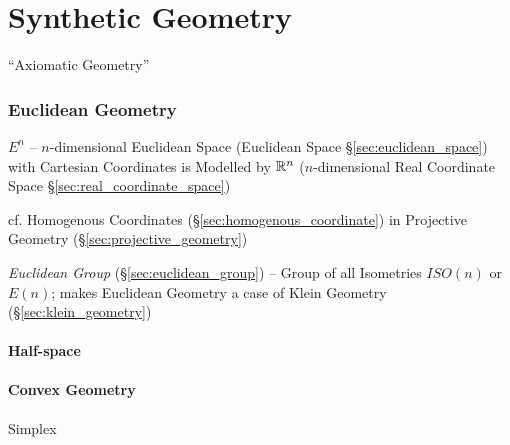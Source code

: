 \part{Synthetic Geometry}\label{part:synthetic_geometry}

``Axiomatic Geometry''



\section{Euclidean Geometry}\label{sec:euclidean_geometry}

$E^n$ -- $n$-dimensional Euclidean Space (Euclidean Space
\S\ref{sec:euclidean_space}) with Cartesian Coordinates is Modelled by
$\mathbb{R}^n$ ($n$-dimensional Real Coordinate Space
\S\ref{sec:real_coordinate_space})

\fist cf. Homogenous Coordinates (\S\ref{sec:homogenous_coordinate})
in Projective Geometry (\S\ref{sec:projective_geometry})

\emph{Euclidean Group} (\S\ref{sec:euclidean_group}) -- Group of all
Isometries $ISO(n)$ or $E(n)$; makes Euclidean Geometry a case of
Klein Geometry (\S\ref{sec:klein_geometry})



\subsection{Half-space}\label{sec:half_space}

\subsection{Convex Geometry}\label{sec:convex_geometry}


Simplex



